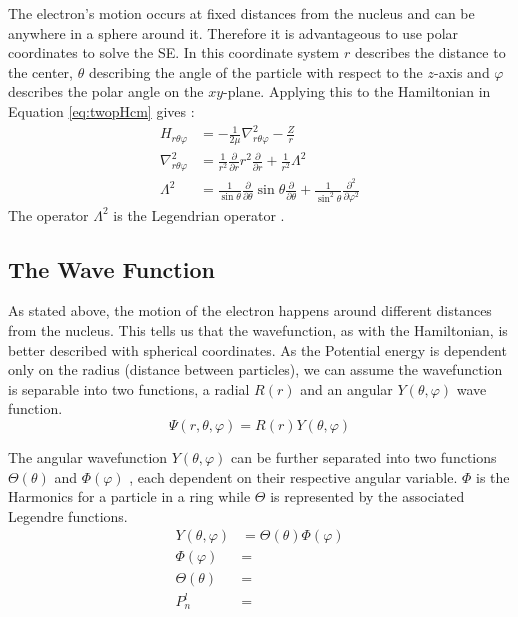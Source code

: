 \documentclass[../master_thesis.tex]{subfiles}
\begin{document}
The electron's motion occurs at fixed distances from the nucleus and can be
anywhere in a sphere around it. Therefore it is advantageous to use polar
coordinates to solve the \ac{SE}. In this coordinate system $r$ describes the
distance to the center, $\theta$ describing the angle of the particle with
respect to the $z$-axis and $\varphi$ describes the polar angle on the
$xy$-plane. Applying this to the Hamiltonian in Equation \ref{eq:twopHcm} gives
\cite{Atkins:2014}:
\begin{equation}
  \begin{split}\label{eq:SphHcm}
    H_{r\theta\varphi} &= -\frac{1}{2\mu}\nabla^2_{r\theta\varphi}
                          -\frac{Z}{r}\\
    \nabla^2_{r\theta\varphi} &=  \frac{1}{r^2}\frac{\partial}{\partial r}
                                  r^2\frac{\partial}{\partial r}
                                  + \frac{1}{r^2}\Lambda^2 \\
    \Lambda^2 &= \frac{1}{\sin{\theta}}\frac{\partial}{
                 \partial\theta}\sin{\theta}\frac{\partial}{\partial\theta}
                 + \frac{1}{\sin^2{\theta}}\frac{\partial^2}{\partial\varphi^2}
  \end{split}
\end{equation}
The operator $\Lambda^2$ is the Legendrian operator \cite{Atkins:2014}.

\subsection{The Wave Function}
As stated above, the motion of the electron happens around different distances
from the nucleus. This tells us that the wavefunction, as with the Hamiltonian,
is better described with spherical coordinates. As the Potential energy is
dependent only on the radius (distance between particles), we can assume the
wavefunction is separable \cite{Atkins:2014} into two functions, a radial $R(r)$
and an angular $Y(\theta, \varphi)$ wave function.
\begin{equation}
  \Psi(r, \theta, \varphi) = R(r) Y(\theta, \varphi)\label{eq:radangsep}
\end{equation}

The angular wavefunction $Y(\theta, \varphi)$ can be further separated into two
functions $ \Theta(\theta) $ and $\Phi(\varphi)$ \cite{Atkins:2014, Simons:2016},
each dependent on their respective angular variable. $\Phi$ is the Harmonics for a particle in a ring \cite{Atkins:2014}
while $ \Theta $ is represented by the associated Legendre functions.
\begin{equation}
  \begin{split}
    Y(\theta, \varphi) &= \Theta(\theta)\Phi(\varphi)\\
    \Phi(\varphi) &= \\
    \Theta(\theta) &= \\
    P_n^l &=
  \end{split}
\end{equation}
\end{document}
